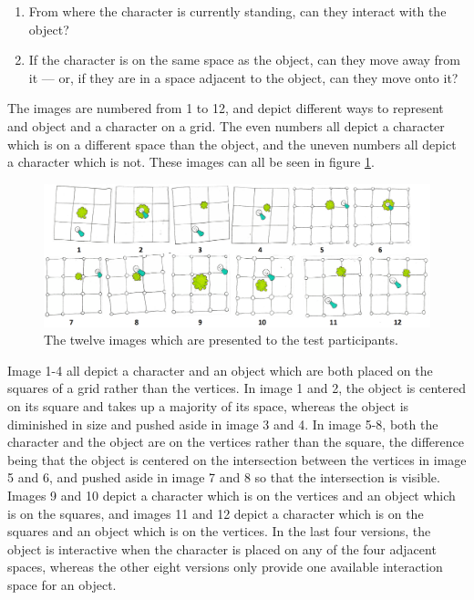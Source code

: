 \begin{enumerate}
    \item From where the character is currently standing, can they interact with the object?
    \item If the character is on the same space as the object, can they move away from it --- or, if they are in a space adjacent to the object, can they move onto it?
\end{enumerate}

The images are numbered from 1 to 12, and depict different ways to represent and object and a character on a grid. The even numbers all depict a character which is on a different space than the object, and the uneven numbers all depict a character which is not. These images can all be seen in figure \ref{fig:papergrid}.

\begin{figure}[h!]
	\centering
	\includegraphics[width=\textwidth]{figures/paper_0.png}
	\caption{The twelve images which are presented to the test participants. \label{fig:papergrid}}
\end{figure}

Image 1-4 all depict a character and an object which are both placed on the squares of a grid rather than the vertices. In image 1 and 2, the object is centered on its square and takes up a majority of its space, whereas the object is diminished in size and pushed aside in image 3 and 4. In image 5-8, both the character and the object are on the vertices rather than the square, the difference being that the object is centered on the intersection between the vertices in image 5 and 6, and pushed aside in image 7 and 8 so that the intersection is visible. Images 9 and 10 depict a character which is on the vertices and an object which is on the squares, and images 11 and 12 depict a character which is on the squares and an object which is on the vertices. In the last four versions, the object is interactive when the character is placed on any of the four adjacent spaces, whereas the other eight versions only provide one available interaction space for an object.

